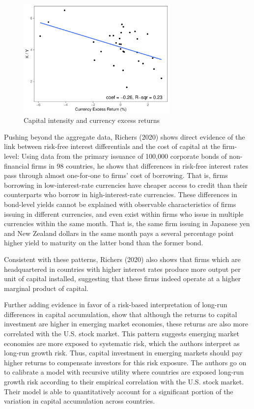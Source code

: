 \documentclass{ar-1col}
\begin{document}
\begin{figure}[htp]
    \centering
    \caption{Capital intensity and currency excess returns}
    \label{fig:ky_rx}
    \includegraphics[width=0.7\textwidth]{Exhibits/Figure_KY_RX.pdf}
\end{figure}

Pushing beyond the aggregate data, Richers (2020) shows direct evidence of the link between  risk-free interest differentials and the cost of capital at the firm-level: Using data from the primary issuance of 100,000 corporate bonds of non-financial firms in 98 countries, he shows that differences in risk-free interest rates pass through almost one-for-one to firms' cost of borrowing. That is, firms borrowing in low-interest-rate currencies have cheaper access to credit than their counterparts who borrow in high-interest-rate currencies. These differences in bond-level yields cannot be explained with observable characteristics of firms issuing in different currencies, and even exist within firms who issue in multiple currencies within the same month. That is, the same firm issuing in Japanese yen and New Zealand dollars in the same month pays a several percentage point higher yield to maturity on the latter bond than the former bond. 

Consistent with these patterns, Richers (2020) also shows that firms which are headquartered in countries with higher interest rates produce more output per unit of capital installed, suggesting that these firms indeed operate at a higher marginal product of capital. 

Further adding evidence in favor of a risk-based interpretation of long-run differences in capital accumulation, \citet{DavidHenriksenSimonovska2014} show that although the returns to capital investment are higher in emerging market economies, these returns are also more correlated with the U.S. stock market. This pattern suggests emerging market economies are more exposed to systematic risk, which the authors interpret as long-run growth risk. Thus, capital investment in emerging markets should pay higher returns to compensate investors for this risk exposure. The authors go on to calibrate a model with recursive utility where countries are exposed long-run growth risk according to their empirical correlation with the U.S. stock market. Their model is able to quantitatively account for a significant portion of the variation in capital accumulation across countries.
\end{document}
